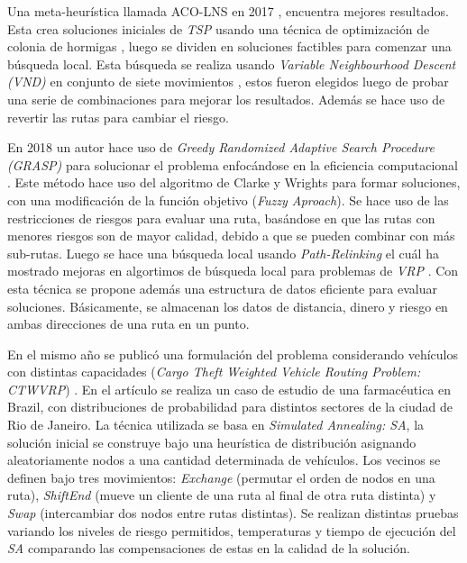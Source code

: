 \documentclass[conference]{IEEEtran}
\begin{document}
Una meta-heurística llamada ACO-LNS en 2017 \cite{TALARICO2017547}, encuentra mejores resultados. Esta crea soluciones iniciales de \textit{TSP} usando una técnica de optimización de colonia de hormigas \cite{585892}, luego se dividen \cite{prins} en soluciones factibles para comenzar una búsqueda local. Esta búsqueda se realiza usando \textit{Variable Neighbourhood Descent (VND)} en conjunto de siete movimientos \cite{braysy2005vehicle}, estos fueron elegidos luego de probar una serie de combinaciones para mejorar los resultados. Además se hace uso de revertir las rutas para cambiar el riesgo.

En 2018 un autor hace uso de \textit{Greedy Randomized Adaptive Search Procedure (GRASP)} \cite{grasp1} \cite{grasp2} para solucionar el problema enfocándose en la eficiencia computacional \cite{RADOJICIC2018486}. Este método hace uso del algoritmo de Clarke y Wrights \cite{clarke&wright} para formar soluciones, con una modificación de la función objetivo (\textit{Fuzzy Aproach}). Se hace uso de las restricciones de riesgos para evaluar una ruta, basándose en que las rutas con menores riesgos son de mayor calidad, debido a que se pueden combinar con más sub-rutas. Luego se hace una búsqueda local usando \textit{Path-Relinking} el cuál ha mostrado mejoras en algortimos de búsqueda local para problemas de \textit{VRP} \cite{ho2006path}. Con esta técnica se propone además una estructura de datos eficiente para evaluar soluciones. Básicamente, se almacenan los datos de distancia, dinero y riesgo en ambas direcciones de una ruta en un punto.

En el mismo año se publicó una formulación del problema considerando vehículos con distintas capacidades (\textit{Cargo Theft Weighted Vehicle Routing Problem: CTWVRP}) \cite{Repolho2019}. En el artículo se realiza un caso de estudio de una farmacéutica en Brazil, con distribuciones de probabilidad para distintos sectores de la ciudad de Rio de Janeiro. La técnica utilizada se basa en \textit{Simulated Annealing: SA}, la solución inicial se construye bajo una heurística de distribución asignando aleatoriamente nodos a una cantidad determinada de vehículos. Los vecinos se definen bajo tres movimientos: \textit{Exchange} (permutar el orden de nodos en una ruta), \textit{ShiftEnd} (mueve un cliente de una ruta al final de otra ruta distinta) y \textit{Swap} (intercambiar dos nodos entre rutas distintas). Se realizan distintas pruebas variando los niveles de riesgo permitidos, temperaturas y tiempo de ejecución del \textit{SA} comparando las compensaciones de estas en la calidad de la solución. 
\end{document}
